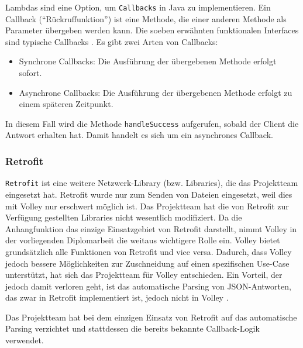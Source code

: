 Lambdas sind eine Option, um \texttt{Callbacks} in Java zu
implementieren. Ein Callback (``Rückruffunktion'') ist eine Methode, die
einer anderen Methode als Parameter übergeben werden kann. Die soeben
erwähnten funktionalen Interfaces sind typische Callbacks
\cite{Callbacks}. Es gibt zwei Arten von Callbacks:

\begin{itemize}
\tightlist
\item
  Synchrone Callbacks: Die Ausführung der übergebenen Methode erfolgt
  sofort.
\item
  Asynchrone Callbacks: Die Ausführung der übergebenen Methode erfolgt
  zu einem späteren Zeitpunkt.
\end{itemize}

In diesem Fall wird die Methode \texttt{handleSuccess} aufgerufen,
sobald der Client die Antwort erhalten hat. Damit handelt es sich um ein
asynchrones Callback.

\hypertarget{retrofit}{%
\subsubsection{Retrofit}\label{retrofit}}

\texttt{Retrofit} ist eine weitere Netzwerk-Library (bzw. Libraries),
die das Projektteam eingesetzt hat. Retrofit wurde nur zum Senden von
Dateien eingesetzt, weil dies mit Volley nur erschwert möglich ist. Das
Projektteam hat die von Retrofit zur Verfügung gestellten Libraries
nicht wesentlich modifiziert. Da die Anhangfunktion das einzige
Einsatzgebiet von Retrofit darstellt, nimmt Volley in der vorliegenden
Diplomarbeit die weitaus wichtigere Rolle ein. Volley bietet
grundsätzlich alle Funktionen von Retrofit und vice versa. Dadurch, dass
Volley jedoch bessere Möglichkeiten zur Zuschneidung auf einen
spezifischen Use-Case unterstützt, hat sich das Projektteam für Volley
entschieden. Ein Vorteil, der jedoch damit verloren geht, ist das
automatische Parsing von JSON-Antworten, das zwar in Retrofit
implementiert ist, jedoch nicht in Volley \cite{retrofit-vs-volley}.

Das Projektteam hat bei dem einzigen Einsatz von Retrofit auf das
automatische Parsing verzichtet und stattdessen die bereits bekannte
Callback-Logik verwendet.

